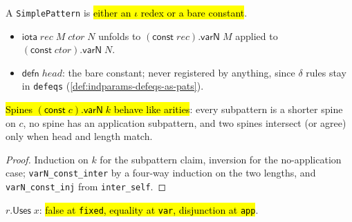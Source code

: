 \begin{definition}
\label{inductive:simple-pattern}
\leanok
{}
 A \texttt{SimplePattern} is \hl{either an $\iota$ redex or a bare constant}.
\begin{itemize}
\item $\mathsf{iota}\;rec\;M\;ctor\;N$ unfolds to $(\mathsf{const}\;rec).\mathsf{varN}\;M$
applied to $(\mathsf{const}\;ctor).\mathsf{varN}\;N$.
\item $\mathsf{defn}\;head$: the bare constant; never registered by anything, since
$\delta$ rules stay in \texttt{defeqs} (\ref{def:indparams-defeqs-as-pats}).
\end{itemize}
\end{definition}

\begin{lemma}
\label{family:pattern-spine-combinatorics}
\leanok
{} 

 \hl{Spines $(\mathsf{const}\;c).\mathsf{varN}\;k$ behave like arities}: every
subpattern is a shorter spine on $c$, no spine has an application subpattern, and two spines
intersect (or agree) only when head and length match.
\end{lemma}
\begin{proof}
\leanok
{} Induction on $k$ for the subpattern claim, inversion for the no-application
case; \texttt{varN\_const\_inter} by a four-way induction on the two lengths, and
\texttt{varN\_const\_inj} from \texttt{inter\_self}.
\end{proof}

\begin{definition}
\label{def:pattern-rhs-uses}
\leanok
{} 

 $r.\mathsf{Uses}\;x$: \hl{false at \texttt{fixed}, equality at \texttt{var},
disjunction at \texttt{app}}.
\end{definition}

